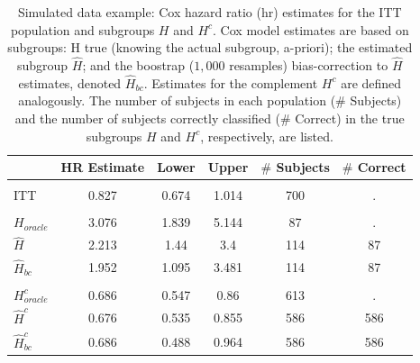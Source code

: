 \documentclass[smallextended]{svjour3}
\begin{document}
\begin{table}

\caption{\label{tab:simex_tab}\label{tab:simex} Simulated data example: Cox hazard ratio (hr) estimates for the ITT population and subgroups $H$ and $H^{c}$.
Cox model estimates are based on subgroups: H true (knowing the actual subgroup, a-priori); the estimated subgroup $\hat{H}$; and 
the boostrap ($1,000$ resamples) bias-correction to $\hat{H}$ estimates, denoted $\hat{H}_{bc}$.  Estimates for the complement $H^{c}$ are defined analogously.
The number of subjects in each population ($\#$ Subjects) and the number of subjects correctly classified ($\#$ Correct) in the true subgroups $H$ and $H^{c}$, respectively, are listed.}
\centering
\fontsize{9}{11}\selectfont
\begin{tabular}[t]{lccccc}
\toprule
  & HR Estimate & Lower & Upper & $\#$ Subjects & $\#$ Correct\\
\midrule
\addlinespace[0.3em]
\multicolumn{6}{l}{\textbf{ITT}}\\
\hspace{1em}ITT & 0.827 & 0.674 & 1.014 & 700 & .\\
\addlinespace[0.3em]
\multicolumn{6}{l}{\textbf{H subgroup estimates}}\\
\hspace{1em}$H_{oracle}$ & 3.076 & 1.839 & 5.144 & 87 & .\\
\hspace{1em}$\hat{H}$ & 2.213 & 1.44 & 3.4 & 114 & 87\\
\hspace{1em}$\hat{H}_{bc}$ & 1.952 & 1.095 & 3.481 & 114 & 87\\
\addlinespace[0.3em]
\multicolumn{6}{l}{\textbf{H-complement subgroup estimates}}\\
\hspace{1em}$H^{c}_{oracle}$ & 0.686 & 0.547 & 0.86 & 613 & .\\
\hspace{1em}$\hat{H}^{c}$ & 0.676 & 0.535 & 0.855 & 586 & 586\\
\hspace{1em}$\hat{H}^{c}_{bc}$ & 0.686 & 0.488 & 0.964 & 586 & 586\\
\bottomrule
\end{tabular}
\end{table}





\end{document}
